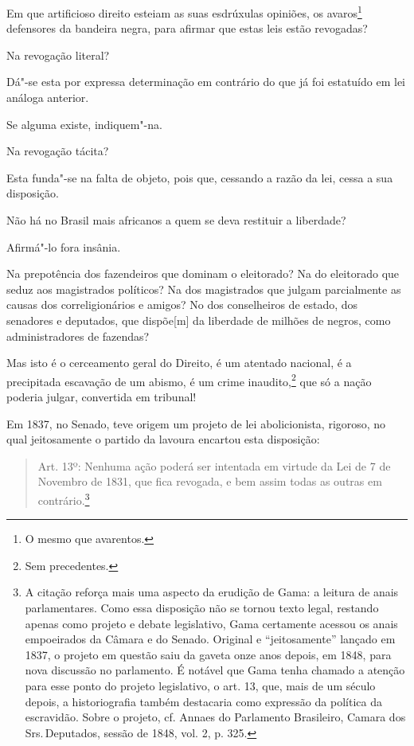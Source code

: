 \asterisc

Em que artificioso direito esteiam as suas esdrúxulas opiniões, os
avaros\footnote{O mesmo que avarentos.} defensores da bandeira negra,
para afirmar que estas leis estão revogadas?

Na revogação literal?

Dá"-se esta por expressa determinação em contrário do que já foi
estatuído em lei análoga anterior.

Se alguma existe, indiquem"-na.

Na revogação tácita?

Esta funda"-se na falta de objeto, pois que, cessando a razão da lei,
cessa a sua disposição.

Não há no Brasil mais africanos a quem se deva restituir a liberdade?

Afirmá"-lo fora insânia.

Na prepotência dos fazendeiros que dominam o eleitorado? Na do
eleitorado que seduz aos magistrados políticos? Na dos magistrados que
julgam parcialmente as causas dos correligionários e amigos? No dos
conselheiros de estado, dos senadores e deputados, que dispõe{[}m{]} da
liberdade de milhões de negros, como administradores de fazendas?

Mas isto é o cerceamento geral do Direito, é um atentado nacional, é a
precipitada escavação de um abismo, é um crime inaudito,\footnote{Sem
  precedentes.} que só a nação poderia julgar, convertida em tribunal!

Em 1837, no Senado, teve origem um projeto de lei abolicionista,
rigoroso, no qual jeitosamente o partido da lavoura encartou esta
disposição:

\begin{quote}
Art. 13º: Nenhuma ação poderá ser intentada em virtude da Lei de 7 de
Novembro de 1831, que fica revogada, e bem assim todas as outras em
contrário.\footnote{A citação reforça mais uma aspecto da erudição de
  Gama: a leitura de anais parlamentares. Como essa disposição não se
  tornou texto legal, restando apenas como projeto e debate legislativo,
  Gama certamente acessou os anais empoeirados da Câmara e do Senado.
  Original e ``jeitosamente'' lançado em 1837, o projeto em questão saiu
  da gaveta onze anos depois, em 1848, para nova discussão no
  parlamento. É notável que Gama tenha chamado a atenção para esse ponto
  do projeto legislativo, o art. 13, que, mais de um século depois, a
  historiografia também destacaria como expressão da política da
  escravidão. Sobre o projeto, cf. Annaes do Parlamento Brasileiro,
  Camara dos Srs.\,Deputados, sessão de 1848, vol. 2, p. 325.}
\end{quote}

